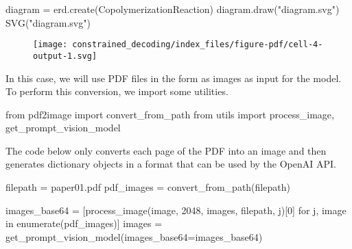 \documentclass[
  letterpaper,
  DIV=11,
  numbers=noendperiod]{scrreprt}
\newenvironment{Shaded}{\begin{snugshade}}{\end{snugshade}}
\newcommand{\BuiltInTok}[1]{\textcolor[rgb]{0.00,0.23,0.31}{#1}}
\newcommand{\ControlFlowTok}[1]{\textcolor[rgb]{0.00,0.23,0.31}{#1}}
\newcommand{\DecValTok}[1]{\textcolor[rgb]{0.68,0.00,0.00}{#1}}
\newcommand{\ImportTok}[1]{\textcolor[rgb]{0.00,0.46,0.62}{#1}}
\newcommand{\KeywordTok}[1]{\textcolor[rgb]{0.00,0.23,0.31}{#1}}
\newcommand{\NormalTok}[1]{\textcolor[rgb]{0.00,0.23,0.31}{#1}}
\newcommand{\OperatorTok}[1]{\textcolor[rgb]{0.37,0.37,0.37}{#1}}
\newcommand{\StringTok}[1]{\textcolor[rgb]{0.13,0.47,0.30}{#1}}
\begin{document}
\begin{Shaded}
\begin{Highlighting}[]
\NormalTok{diagram }\OperatorTok{=}\NormalTok{ erd.create(CopolymerizationReaction)}
\NormalTok{diagram.draw(}\StringTok{"diagram.svg"}\NormalTok{)}
\NormalTok{SVG(}\StringTok{"diagram.svg"}\NormalTok{)}
\end{Highlighting}
\end{Shaded}

\begin{figure}[H]

{\centering \texttt{[image: constrained\_decoding/index\_files/figure-pdf/cell-4-output-1.svg]}

}

\end{figure}

In this case, we will use PDF files in the form as images as input for
the model. To perform this conversion, we import some utilities.

\begin{Shaded}
\begin{Highlighting}[]
\ImportTok{from}\NormalTok{ pdf2image }\ImportTok{import}\NormalTok{ convert\_from\_path}
\ImportTok{from}\NormalTok{ utils }\ImportTok{import}\NormalTok{ process\_image, get\_prompt\_vision\_model}
\end{Highlighting}
\end{Shaded}

The code below only converts each page of the PDF into an image and then
generates dictionary objects in a format that can be used by the OpenAI
API.

\begin{Shaded}
\begin{Highlighting}[]
\NormalTok{filepath }\OperatorTok{=} \StringTok{\textquotesingle{}paper01.pdf\textquotesingle{}}
\NormalTok{pdf\_images }\OperatorTok{=}\NormalTok{ convert\_from\_path(filepath)}

\NormalTok{images\_base64 }\OperatorTok{=}\NormalTok{ [process\_image(image, }\DecValTok{2048}\NormalTok{, }\StringTok{\textquotesingle{}images\textquotesingle{}}\NormalTok{, filepath, j)[}\DecValTok{0}\NormalTok{] }\ControlFlowTok{for}\NormalTok{ j, image }\KeywordTok{in} \BuiltInTok{enumerate}\NormalTok{(pdf\_images)]}
\NormalTok{images }\OperatorTok{=}\NormalTok{ get\_prompt\_vision\_model(images\_base64}\OperatorTok{=}\NormalTok{images\_base64)}
\end{Highlighting}
\end{Shaded}
\end{document}
